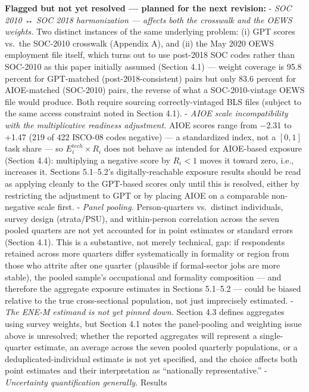 \documentclass[
  11pt,
]{article}
\begin{document}
\textbf{Flagged but not yet resolved --- planned for the next revision:}
- \emph{SOC 2010 ↔ SOC 2018 harmonization --- affects both the crosswalk
and the OEWS weights.} Two distinct instances of the same underlying
problem: (i) GPT scores vs.~the SOC-2010 crosswalk (Appendix A), and
(ii) the May 2020 OEWS employment file itself, which turns out to use
post-2018 SOC codes rather than SOC-2010 as this paper initially assumed
(Section 4.1) --- weight coverage is 95.8 percent for GPT-matched
(post-2018-consistent) pairs but only 83.6 percent for AIOE-matched
(SOC-2010) pairs, the reverse of what a SOC-2010-vintage OEWS file would
produce. Both require sourcing correctly-vintaged BLS files (subject to
the same access constraint noted in Section 4.1). - \emph{AIOE scale
incompatibility with the multiplicative readiness adjustment.} AIOE
scores range from −2.31 to +1.47 (219 of 422 ISCO-08 codes negative) ---
a standardized index, not a \([0, 1]\) task share --- so
\(E_i^{tech} \times R_i\) does not behave as intended for AIOE-based
exposure (Section 4.4): multiplying a negative score by \(R_i < 1\)
moves it toward zero, i.e., increases it. Sections 5.1--5.2's
digitally-reachable exposure results should be read as applying cleanly
to the GPT-based scores only until this is resolved, either by
restricting the adjustment to GPT or by placing AIOE on a comparable
non-negative scale first. - \emph{Panel pooling.} Person-quarters
vs.~distinct individuals, survey design (strata/PSU), and within-person
correlation across the seven pooled quarters are not yet accounted for
in point estimates or standard errors (Section 4.1). This is a
substantive, not merely technical, gap: if respondents retained across
more quarters differ systematically in formality or region from those
who attrite after one quarter (plausible if formal-sector jobs are more
stable), the pooled sample's occupational and formality composition ---
and therefore the aggregate exposure estimates in Sections 5.1--5.2 ---
could be biased relative to the true cross-sectional population, not
just imprecisely estimated. - \emph{The ENE-M estimand is not yet pinned
down.} Section 4.3 defines aggregates using survey weights, but Section
4.1 notes the panel-pooling and weighting issue above is unresolved;
whether the reported aggregates will represent a single-quarter
estimate, an average across the seven pooled quarterly populations, or a
deduplicated-individual estimate is not yet specified, and the choice
affects both point estimates and their interpretation as ``nationally
representative.'' - \emph{Uncertainty quantification generally.} Results
\end{document}
